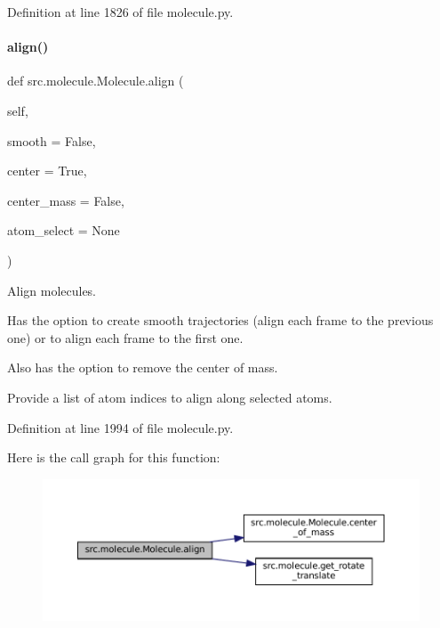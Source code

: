 Definition at line 1826 of file molecule.\+py.

\mbox{\label{classsrc_1_1molecule_1_1Molecule_ad74d00f84b4b0b66b18de8a3f6b41c88}} 
\paragraph{\texorpdfstring{align()}{align()}}
{\footnotesize\ttfamily def src.\+molecule.\+Molecule.\+align (\begin{DoxyParamCaption}\item[{}]{self,  }\item[{}]{smooth = {\ttfamily False},  }\item[{}]{center = {\ttfamily True},  }\item[{}]{center\+\_\+mass = {\ttfamily False},  }\item[{}]{atom\+\_\+select = {\ttfamily None} }\end{DoxyParamCaption})}



Align molecules. 

Has the option to create smooth trajectories (align each frame to the previous one) or to align each frame to the first one.

Also has the option to remove the center of mass.

Provide a list of atom indices to align along selected atoms. 

Definition at line 1994 of file molecule.\+py.

Here is the call graph for this function\+:
\nopagebreak
\begin{figure}[H]
\begin{center}
\leavevmode
\includegraphics[width=350pt]{classsrc_1_1molecule_1_1Molecule_ad74d00f84b4b0b66b18de8a3f6b41c88_cgraph}
\end{center}
\end{figure}
\mbox{\label{classsrc_1_1molecule_1_1Molecule_a73446a192061fe52b26899005e3bbc31}} 
